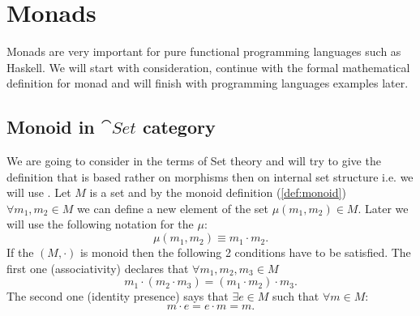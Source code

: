 \chapter{Monads}

Monads are very important for pure functional programming languages
such as Haskell. We will start with 
consideration, continue with the formal mathematical definition for
monad and
will finish with programming languages examples later.

\section{Monoid in $\cat{Set}$ category}
We are going to consider  in the terms of Set theory and
will try to give the definition that is based rather on morphisms then
on internal set structure i.e. we will use
. Let $M$ is a set and by the
monoid 
definition (\cref{def:monoid})
$\forall m_1, m_2 \in M$ we can define a new element of the set
$\mu(m_1, m_2) \in M$. Later we will use the following notation for
the $\mu$:
\[
\mu(m_1, m_2) \equiv m_1 \cdot m_2.
\]
If the $(M, \cdot)$ is monoid then the following 2 conditions have to
be satisfied. The first one (associativity) declares that $\forall
m_1, m_2, m_3 \in M$ 
\begin{equation}
\label{eq:monoid1}
m_1 \cdot ( m_2 \cdot m_3) = ( m_1 \cdot
m_2 ) \cdot m_3.
\end{equation}
The second one (identity presence) says that
\(
\exists e \in M
\) such that $\forall m \in M$:
\begin{equation}
\label{eq:monoid2}
m \cdot e = e \cdot m = m.
\end{equation}

